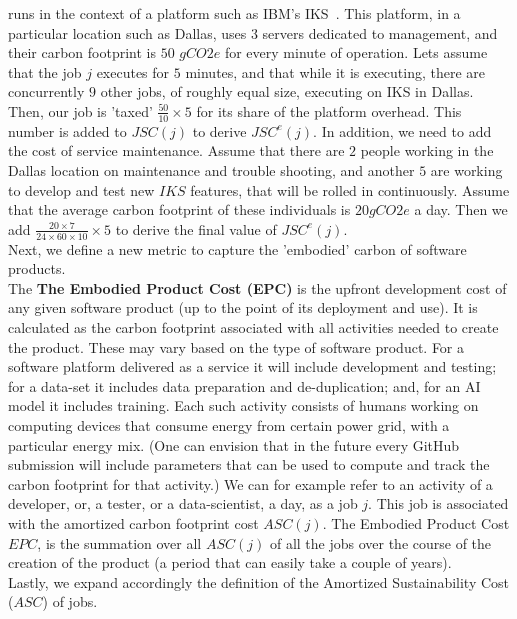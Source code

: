 runs in the context of a platform such as IBM's IKS~\cite{}. This platform, in a particular location such as Dallas, uses $3$ servers dedicated to management, and their carbon footprint is $50$ $gCO2e$ for every minute
of operation. Lets assume that the job $j$ executes for $5$ minutes, and that while it is executing, there are concurrently $9$ other jobs, of roughly equal size, executing on IKS in Dallas. Then, our job is 'taxed' $\frac{50}{10} \times 5$ for its share of the platform overhead. This 
number is added to $JSC(j)$ to derive $JSC^e(j)$. In addition, we need to add the cost of service maintenance. 
Assume that there are $2$ people working in the Dallas location on maintenance and trouble shooting, and another $5$ are working to develop and test new $IKS$ features, that will be rolled in continuously. Assume that 
the average carbon footprint of these individuals is $20gCO2e$ a day. Then we add $\frac{20\times 7}{24\times 60\times 10} \times 5$ to derive the final value of $JSC^e(j)$.
\\
Next, we define a new metric to capture the 'embodied' carbon of software products. \\ The {\bf The Embodied Product Cost (EPC)} is the upfront development cost of any given software product (up to the point of its deployment and use). It is calculated as the carbon footprint associated with all activities needed to create the product. These  may vary based on the type of software product. For a software platform delivered as a service it will include development and testing; for a data-set it includes data preparation and de-duplication; and,
for an AI model it includes training. Each such activity consists of humans working on computing devices that consume energy from certain power grid, with a particular energy mix. (One can envision that in the future every 
GitHub submission will include parameters that can be used to compute and track the carbon footprint for that activity.) We can for example refer to an activity of a developer, or, a tester, or a data-scientist, a day, as a job $j$.  This job is associated with the amortized carbon footprint cost $ASC(j)$. The Embodied Product Cost 
$EPC$, is the summation over all $ASC(j)$ of all the jobs over the course of the creation of 
the product (a period that can easily take a couple of years).  
\\
Lastly, we expand accordingly the definition of the Amortized Sustainability Cost ($ASC$) of jobs. 
